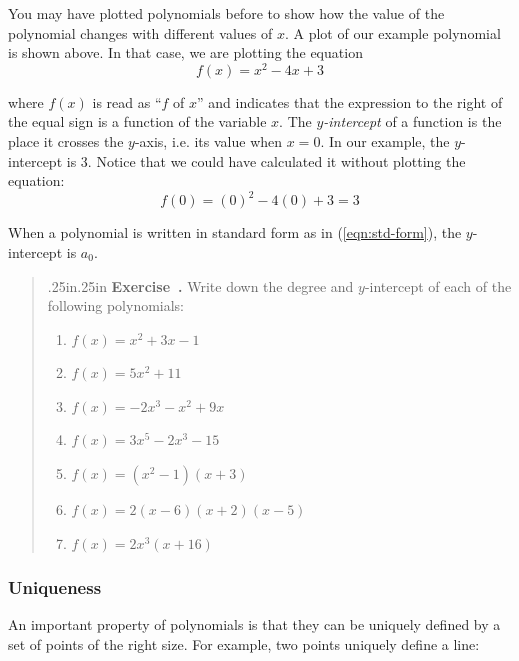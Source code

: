 \documentclass[12 pt]{article}
\newcounter{exercise}[section]
\newenvironment{exercise}{\refstepcounter{exercise}\par\bigskip \begin{quotation}{}{\leftmargin .25in\rightmargin .25in}
    \noindent \textbf{Exercise~\thesection.\theexercise }  \rmfamily}{\end{quotation}\par\bigskip}
\newcounter{example}[section]
\begin{document}
You may have plotted polynomials before to show how the value of the polynomial changes 
with different values of $x$. A plot of our example polynomial is shown above.
In that case, we are plotting the equation 
\[
    f(x) = x^2 - 4x + 3
\]

where $f(x)$ is read as ``$f$ of $x$'' and indicates that the expression 
to the right of the equal sign is a function of the variable $x$. 
The \emph{$y$-intercept} of a function is the place it crosses the $y$-axis, 
i.e. its value when $x=0$. In our example, the $y$-intercept is 3. Notice 
that we could have calculated it without plotting the equation:
\[
    f(0) = (0)^2 - 4(0) + 3 = 3
\]



When a polynomial is written in standard form as in (\ref{eqn:std-form}), 
the $y$-intercept is $a_0$.



\begin{exercise}
    Write down the degree and $y$-intercept of each of the following 
    polynomials:
    \renewcommand{\labelenumi}{(\alph{enumi})} 
    \begin{enumerate}
        \item $f(x) = x^2 + 3x - 1$
        \item $f(x) = 5x^2 + 11$
        \item $f(x) = -2x^3 - x^2 + 9x$
        \item $f(x) = 3x^5 - 2x^3 - 15$
        \item $f(x) = (x^2-1)(x+3)$
        \item $f(x) = 2(x-6)(x+2)(x-5)$
        \item $f(x) = 2x^3(x+16)$
    \end{enumerate}
\end{exercise}

\subsubsection{Uniqueness}\label{sec:unique}

An important property of polynomials is that they can be uniquely defined 
by a set of points of the right size. For example, two points uniquely 
define a line:
\end{document}
